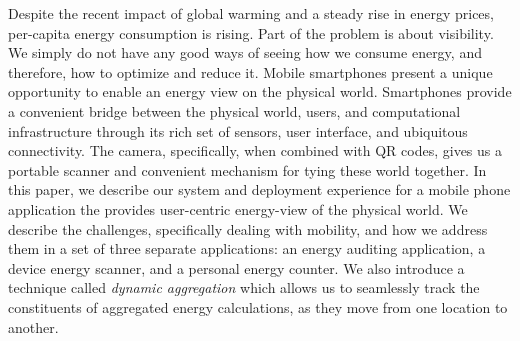 Despite the recent impact of global warming and a steady rise in energy prices, 
per-capita energy consumption is rising. Part of the problem is about visibility. We simply do not 
have any good ways of seeing how we consume energy, and therefore, how to optimize and reduce it. 
Mobile smartphones present a unique opportunity to enable an energy view on the physical world. 
Smartphones provide a convenient bridge between the physical world, users, and computational infrastructure 
through its rich set of sensors, user interface, and ubiquitous connectivity. The camera, specifically,
when combined with QR codes, gives us a portable scanner and convenient mechanism for tying these world together. 
In this paper, we describe our system and deployment experience for a mobile phone application the provides 
user-centric energy-view of the physical world. We describe the challenges, specifically dealing with mobility, 
and how we address them in a set of three separate applications: an energy auditing application, a 
device energy scanner, and a personal energy counter. We also introduce a technique called \emph{dynamic aggregation}
which allows us to seamlessly track the constituents of aggregated energy calculations, as they move from one 
location to another.